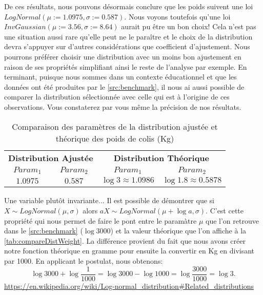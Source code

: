 De ces résultats, nous pouvons désormais conclure que les poids suivent une loi $LogNormal(\mu := 1.0975,\sigma := 0.587)$. Nous voyons toutefois qu'une loi $InvGaussian(\mu := 3.56,\sigma := 8.64)$ aurait pu être un bon choix! Cela n'est pas une situation aussi rare qu'elle peut ne le paraître et le choix de la distribution devra s'appuyer sur d'autres considérations que coefficient d'ajustement. Nous pourrons préférer choisir une distribution avec un moins bon ajustement en raison de ses propriétés simplifiant ainsi le reste de l'analyse par exemple. En terminant, puisque nous sommes dans un contexte éducationnel et que les données ont été produites par le \autoref{src:benchmark}, il nous ai aussi possible de comparer la distribution sélectionnée avec celle qui est à l'origine de ces observations. Vous constaterez par vous même la précision de nos résultats. \\

\begin{table}
	\centering
	\begin{tabular}{cccc}
		\multicolumn{2}{c}{\textbf{Distribution Ajustée}} & \multicolumn{2}{c}{\textbf{Distribution Théorique}} \\
		\textbf{$Param_1$} & \textbf{$Param_2$} & \textbf{$Param_1$} & \textbf{$Param_2$} \\
		\hline
		$1.0975$ & $0.587$ & $\log{3} \approx 1.0986$ & $\log{1.8} \approx 0.5878$
	\end{tabular}
	\caption{Comparaison des paramètres de la distribution ajustée et théorique des poids de colis (Kg)}
	\label{tab:compareDistWeight}
\end{table}

\begin{moreInfo}{Une variable plutôt invariante...}
	Il est possible de démontrer que si $X \sim LogNormal(\mu,\sigma)$ alors $aX \sim LogNormal(\mu + \log{a},\sigma)$. C'est cette propriété qui nous permet de faire le pont entre le paramàtre $\mu$ que l'on retrouve dans le \autoref{src:benchmark} ($\log{3000}$) et la valeur théorique que l'on affiche à la \autoref{tab:compareDistWeight}. La différence provient du fait que nous avons créer notre fonction théorique en gramme pour ensuite la convertir en Kg en divisant par 1000. En applicant le postulat, nous obtenons: 
	$$\log{3000}+\log{\frac{1}{1000}} = \log{3000}-\log{1000} = \log{\frac{3000}{1000}} = \log{3}.$$
	\url{https://en.wikipedia.org/wiki/Log-normal_distribution#Related_distributions}
\end{moreInfo}
